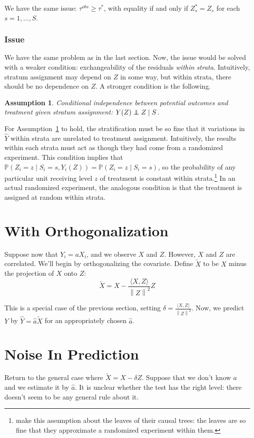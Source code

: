 \documentclass[12pt]{article}
\newtheorem{assumption}{Assumption}
\newcommand{\pr}{\mathbb{P}} %
\newcommand\independent{\protect\mathpalette{\protect\independenT}{\perp}}
\def\independenT#1#2{\mathrel{\rlap{$#1#2$}\mkern2mu{#1#2}}}
\begin{document}
We have the same issue: $\tau^{obs} \geq \tau^*$, with equality if and only if $Z_s^* = Z_s$ for each $s = 1,\dots,S$.

\subsubsection{Issue}
We have the same problem as in the last section.
Now, the issue would be solved with a weaker condition: exchangeability of the residuals \textit{within strata}.
Intuitively, stratum assignment may depend on $Z$ in some way, but within strata, there should be no dependence on $Z$.
A  stronger condition is the following.

\begin{assumption}\label{assume}
Conditional independence between potential outcomes and treatment given stratum assignment: $Y(Z) \independent Z \mid S$.
\end{assumption}

For Assumption~\ref{assume} to hold, the stratification must be so fine that it variations in $\hat{Y}$ within strata are unrelated to treatment assignment.
Intuitively, the results within each strata must act as though they had come from a randomized experiment.
This condition implies that $\pr(Z_i = z \mid S_i = s, Y_i(Z)) = \pr(Z_i = z \mid S_i = s) $, so the probability of any particular unit receiving level $z$ of treatment is constant within strata.\footnote{\citet{wager_estimation_2015} make this assumption about the leaves of their causal trees: the leaves are so fine that they approximate a randomized experiment within them.}
In an actual randomized experiment, the analogous condition is that the treatment is assigned at random within strata.

\section{With Orthogonalization}
Suppose now that $Y_i = a X_i$,
and we observe $X$ and $Z$.
However, $X$ and $Z$ are correlated.
We'll begin by orthogonalizing the covariate. 
Define $\tilde{X}$ to be $X$ minus the projection of $X$ onto $Z$:
$$\tilde{X} = X - \frac{\langle X, Z \rangle}{\left\lVert Z \right\rVert^2} Z$$

This is a special case of the previous section, setting $\delta = \frac{\langle X, Z \rangle}{\left\lVert Z \right\rVert^2}$.
Now, we predict $Y$ by $\hat{Y} = \hat{a} \tilde{X}$ for an appropriately chosen $\hat{a}$.


\section{Noise In Prediction}
Return to the general case where $\tilde{X} = X - \delta Z$.
Suppose that we don't know $a$ and we estimate it by $\hat{a}$.
It is unclear whether the test has the right level: there doesn't seem to be any general rule about it.
\end{document}
